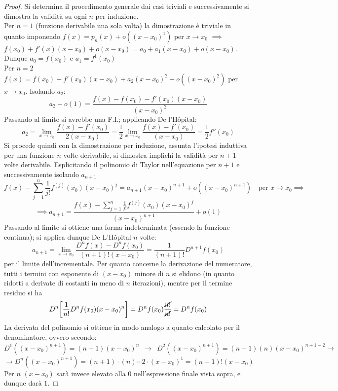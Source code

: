 \documentclass[10pt, oneside]{book}
\theoremstyle{plain}
\begin{document}
\begin{proof}
Si determina il procedimento generale dai casi triviali e successivamente si dimostra la validità su ogni $n$ per induzione.
\\Per $n = 1$ (funzione derivabile una sola volta) la dimostrazione è triviale in quanto imponendo $f(x) = p_n(x) + o ((x - x_0)^1)$ per $x \rightarrow x_0$ $\implies$ $f(x_0) + f'(x)(x-x_0) + o(x-x_0) = a_0 + a_1 (x-x_0) + o(x-x_0)$. Dunque $a_0 = f(x_0)$ e $a_1 = f^1(x_0)$
\\Per $n=2$ $f(x) = f(x_0) + f'(x_0) (x-x_0) + a_2 (x-x_0)^2 + o((x-x_0)^2)$ per $x \rightarrow x_0$. Isolando $a_2$:
\[a_2 + o(1) = \frac{f(x) - f(x_0) - f'(x_0) (x-x_0) }{(x - x_0)^2}\]
Passando al limite si avrebbe una F.I.; applicando De l'H\^opital:
\[a_2 = \lim \limits_{x \rightarrow x_0} \frac{f(x) - f'(x_0)}{2 (x - x_0)} = \frac{1}{2} \lim \limits_{x \rightarrow x_0} \frac{f(x) - f'(x_0)}{(x - x_0)} = \frac{1}{2}f''(x_0)\]
Si procede quindi con la dimostrazione per induzione, assunta l'ipotesi induttiva per una funzione $n$ volte derivabile, si dimostra implichi la validità per $n+1$ volte derivabile. Esplicitando il polinomio di Taylor nell'equazione per $n+1$ e successivamente isolando $a_{n+1}$
\[f(x)- \sum \limits_{j = 1}^n \frac{1}{j!}f^{(j)}(x_0) (x - x_0)^j = a_{n+1}(x - x_0)^{n+1} + o((x-x_0)^{n+1}) \quad \textrm{per } x \rightarrow x_0 \implies\] \[\implies a_{n+1} = \frac{f(x)- \sum \limits_{j = 1}^n \frac{1}{j!}f^{(j)}(x_0) (x - x_0)^j}{(x - x_0)^{n+1}} + o(1)\]
Passando al limite si ottiene una forma indeterminata (essendo la funzione continua); si applica dunque De L'H\^opital $n$ volte:
\[a_{n+1} = \lim \limits_{x \rightarrow x_0} \frac{D^nf(x) - D^nf(x_0)}{(n+1)!(x-x_0)} = \frac{1}{(n+1)!}D^{n+1}f(x_0)\]
per il limite dell'incrementale. Per quanto concerne la derivazione del numeratore, tutti i termini con esponente di $(x - x_0)$ minore di $n$ si elidono (in quanto ridotti a derivate di costanti in meno di $n$ iterazioni), mentre per il termine residuo si ha 
\[D^n \bigg[\frac{1}{n!}D^nf(x_0) (x-x_0)^n\bigg] = D^nf(x_0)\frac{\cancel{n!}}{\cancel{n!}} = D^nf(x_0)\]
La derivata del polinomio si ottiene in modo analogo a quanto calcolato per il denominatore, ovvero secondo:
\[D^1((x-x_0)^{n+1}) = (n+1) (x - x_0)^n \enspace \rightarrow \enspace D^2((x-x_0)^{n+1}) = (n+1)(n) (x - x_0)^{n+1-2} \rightarrow \] \[\rightarrow D^n((x-x_0)^{n+1}) = (n+1) \cdot (n) \cdots 2 \cdot (x - x_0)^1 = (n+1)!(x-x_0)\]
Per $n$ $(x - x_0)$ sarà invece elevato alla $0$ nell'espressione finale vista sopra, e dunque darà $1$.
\end{proof}
\end{document}
